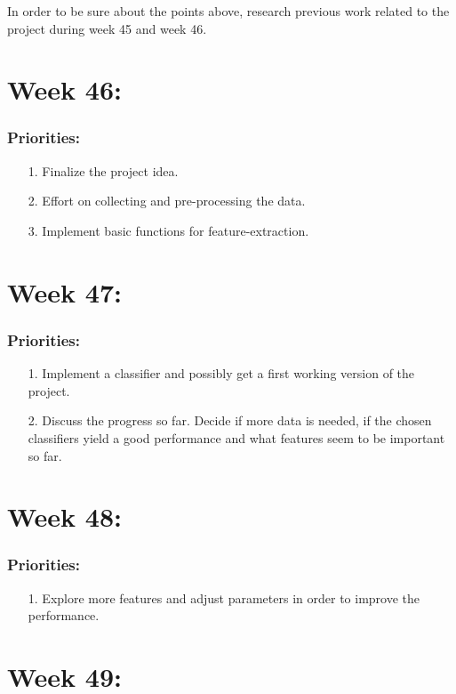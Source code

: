\documentclass{article}
\begin{document}
In order to be sure about the points above, research previous work related to the project during week 45 and week 46.


\section*{Week 46:} 
\subsubsection*{Priorities:}
\begin{itemize}
\item[1.] Finalize the project idea. 
\item[2.] Effort on collecting and pre-processing the data. 
\item[3.] Implement basic functions for feature-extraction.
\end{itemize}


\section*{Week 47:} 
\subsubsection*{Priorities:}
\begin{itemize}
\item[1.] Implement a classifier and possibly get a first working version of the project. 
\item[2.] Discuss the progress so far. Decide if more data is needed, if the chosen classifiers yield a good performance and what features seem to be important so far.
\end{itemize}


\section*{Week 48:} 
\subsubsection*{Priorities:}
\begin{itemize}
\item[1.] Explore more features and adjust parameters in order to improve the performance. 
\end{itemize}


\section*{Week 49:} 
\end{document}
